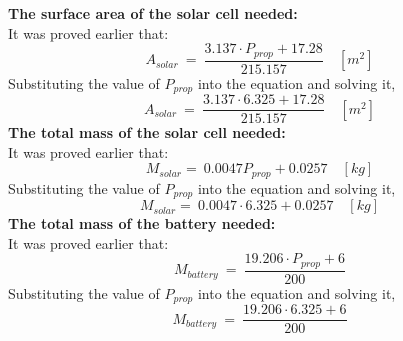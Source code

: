 \vspace{1cm} \p \textbf{The surface area of the solar cell needed:} \vspace{0.1cm}\\ It was proved earlier that: \[ A_{solar} \ = \ \frac{ 3.137 \cdot P_{prop} + 17.28 }{ 215.157 } \quad [m^2] \] Substituting the value of $ P_{prop} $ into the equation and solving it, \[ A_{solar} \ = \ \frac{ 3.137 \cdot 6.325 + 17.28 }{ 215.157 } \quad [m^2] \] \boxfour \vspace{1cm} \p \textbf{The total mass of the solar cell needed:} \vspace{0.1cm}\\ It was proved earlier that: \[ M_{solar} = \ 0.0047 P_{prop} + 0.0257  \quad [kg] \] Substituting the value of $ P_{prop} $ into the equation and solving it, \[ M_{solar} = \ 0.0047 \cdot 6.325 + 0.0257  \quad [kg] \] \boxfive \vspace{1cm} \p \textbf{The total mass of the battery needed:} \vspace{0.1cm}\\ It was proved earlier that: \[ M_{battery} \ = \ \frac{ 19.206 \cdot P_{prop} + 6 }{ 200 } \] Substituting the value of $ P_{prop} $ into the equation and solving it, \[ M_{battery} \ = \ \frac{ 19.206 \cdot 6.325 + 6 }{ 200 } \] \boxsix
